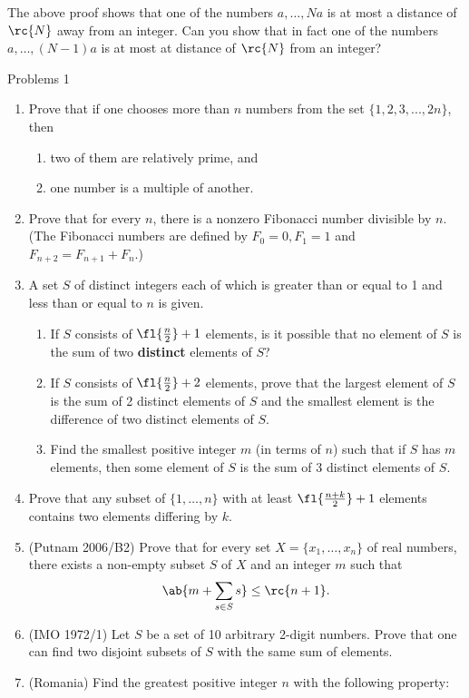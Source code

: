 \begin{rem}
The above proof shows that one of the numbers $a,\ldots, Na$ is at most a distance of $\rc{N}$ away from an integer. Can you show that in fact one of the numbers $a,\ldots, (N-1)a$ is at most at distance of $\rc{N}$ from an integer?
\end{rem} 
{\Large Problems 1}
\begin{enumerate}
\item Prove that if one chooses more than $n$ numbers from the set
$\{1,2,3,...,2n\}$, then 
\begin{enumerate}
\item two of them are relatively prime, and 
\item one number is a multiple of another.
\end{enumerate}
\item Prove that for every $n$, there is a nonzero Fibonacci number divisible by $n$. (The Fibonacci numbers are defined by $F_0=0, F_1=1$ and $F_{n+2}=F_{n+1}+F_n$.)
\item A set $S$ of distinct integers each of which is greater than or equal to 1 and less than or equal to $n$ is given. 
\begin{enumerate}
\item If $S$ consists of $\fl{\frac n2}+1$ elements, is it possible that no element of $S$ is the sum of two \textbf{distinct} elements of $S$? 
\item If $S$ consists of $\fl{\frac n2}+2$ elements, prove that the largest element of $S$ is the sum of 2 distinct elements of $S$ and the smallest element is the difference of two distinct elements of $S$. 
\item 
Find the smallest positive integer $m$ (in terms of $n$) such that if $S$ has $m$ elements, then some element of $S$ is the sum of 3 distinct elements of $S$.
\end{enumerate}
\item Prove that any subset of $\{1,\ldots, n\}$ with at least $\fl{\frac{n+k}{2}}+1$ elements contains two elements differing by $k$.
\item (Putnam 2006/B2) Prove that for every set $X=\{x_1,\ldots, x_n\}$ of real numbers, there exists a non-empty subset $S$ of $X$ and an integer $m$ such that 
\[\ab{m+\sum_{s\in S} s}\leq \rc{n+1}.\]
\item (IMO 1972/1) Let $S$ be a set of 10 arbitrary 2-digit numbers. Prove that one can
find two disjoint subsets of $S$ with the same sum of elements.
\item (Romania) Find the greatest positive integer $n$ with the following property:

\end{enumerate}
